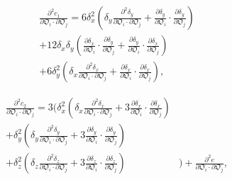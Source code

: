 \documentclass[a4paper,11pt,twoside,openright]{book}
\def\lthtmlcheckvsize{\ifdim\ht\sizebox<\vsize 
  \ifdim\wd\sizebox<\hsize\expandafter\hfill\fi \expandafter\vfill
  \else\expandafter\vss\fi}%
\begin{document}
{\newpage\clearpage
\setcounter{equation}{123}
%
\begin{subequations}\begin{multline}
\frac{\partial^2 c_{1}}{\partial \mathfrak{O}_i \cdot \partial \mathfrak{O}_j}  =
6 \delta_x^2 \left( \delta_y \frac{\partial^2 \delta_y}{\partial \mathfrak{O}_i \cdot \partial \mathfrak{O}_j}
+  \frac{\partial \delta_y}{\partial \mathfrak{O}_i} \cdot \frac{\partial \delta_y}{\partial \mathfrak{O}_j} \right) \\
+  12 \delta_x \delta_y \left( \frac{\partial \delta_x}{\partial \mathfrak{O}_i} \cdot \frac{\partial \delta_y}{\partial \mathfrak{O}_j}
+  \frac{\partial \delta_y}{\partial \mathfrak{O}_i} \cdot \frac{\partial \delta_x}{\partial \mathfrak{O}_j} \right) \\
+  6 \delta_y^2 \left( \delta_x \frac{\partial^2 \delta_x}{\partial \mathfrak{O}_i \cdot \partial \mathfrak{O}_j}
+  \frac{\partial \delta_x}{\partial \mathfrak{O}_i} \cdot \frac{\partial \delta_x}{\partial \mathfrak{O}_j} \right),
\end{multline}\end{subequations}%
\lthtmldisplayZ
\lthtmlcheckvsize\clearpage}

{\newpage\clearpage
\setcounter{equation}{123}
%
\begin{subequations}\begin{align}
\frac{\partial^2 c_{2}}{\partial \mathfrak{O}_i \cdot \partial \mathfrak{O}_j}  =  3 \Bigg(
\delta_x^2 \left( \delta_x \frac{\partial^2 \delta_x}{\partial \mathfrak{O}_i \cdot \partial \mathfrak{O}_j}
+  3 \frac{\partial \delta_x}{\partial \mathfrak{O}_i} \cdot \frac{\partial \delta_x}{\partial \mathfrak{O}_j} \right) & \nonumber \\
+  \delta_y^2 \left( \delta_y \frac{\partial^2 \delta_y}{\partial \mathfrak{O}_i \cdot \partial \mathfrak{O}_j}
+  3 \frac{\partial \delta_y}{\partial \mathfrak{O}_i} \cdot \frac{\partial \delta_y}{\partial \mathfrak{O}_j} \right) & \nonumber \\
+  \delta_z^2 \left( \delta_z \frac{\partial^2 \delta_z}{\partial \mathfrak{O}_i \cdot \partial \mathfrak{O}_j}
+  3 \frac{\partial \delta_z}{\partial \mathfrak{O}_i} \cdot \frac{\partial \delta_z}{\partial \mathfrak{O}_j} \right) &
\Bigg)  +  \frac{\partial^2 e}{\partial \mathfrak{O}_i \cdot \partial \mathfrak{O}_j},
\end{align}\end{subequations}%
\lthtmldisplayZ
\lthtmlcheckvsize\clearpage}
\end{document}

